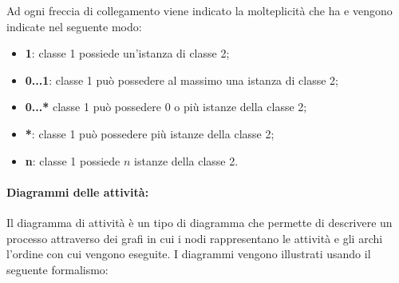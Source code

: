 Ad ogni freccia di collegamento viene indicato la molteplicità che ha e vengono indicate nel seguente modo:
\begin{itemize}
	\item \textbf{1}: classe 1 possiede un'istanza di classe 2;
	\item \textbf{0...1}: classe 1 può possedere al massimo una istanza di classe 2;
	\item \textbf{0...*} classe 1 può possedere 0 o più istanze della classe 2;
	\item \textbf{*}: classe 1 può possedere più istanze della classe 2;
	\item \textbf{n}: classe 1 possiede $n$ istanze della classe 2.
\end{itemize}
\paragraph{Diagrammi delle attività:}\label{ProcessiPrimariProgettazioneUMLDiagrammiDellAttività} 
Il diagramma di attività è un tipo di diagramma che permette di descrivere un processo attraverso dei grafi in cui i nodi rappresentano le attività e gli archi l'ordine con cui vengono eseguite. I diagrammi vengono illustrati usando il seguente formalismo:
